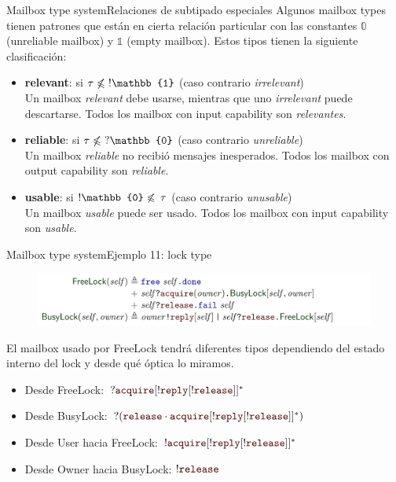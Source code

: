 \documentclass{beamer}
\newcommand{\msgtag}[1]{\texttt{\textcolor{msg-color}{#1}}}
\begin{document}
\begin{frame}{Mailbox type system}{Relaciones de subtipado especiales}
    Algunos mailbox types tienen patrones que están en cierta relación particular con las constantes $\mathbb{0}$ (unreliable mailbox) y $\mathbb{1}$ (empty mailbox). Estos tipos tienen la siguiente clasificación:
    \vspace{1em}

    \begin{itemize}
        \item \textbf{relevant}: si $\tau \not\leqslant \hspace{0.3em} !\mathbb{1}$ (caso contrario \emph{irrelevant})
        \\ Un mailbox \emph{relevant} debe usarse, mientras que uno \emph{irrelevant} puede descartarse. Todos los mailbox con input capability son \emph{relevantes}.
        \item \textbf{reliable}: si $\tau \not\leqslant \hspace{0.3em} ?\mathbb{0}$ (caso contrario \emph{unreliable})
        \\ Un mailbox \emph{reliable} no recibió mensajes inesperados. Todos los mailbox con output capability son \emph{reliable}.
        \item \textbf{usable}: si $!\mathbb{0} \not\leqslant \hspace{0.2em} \tau$ (caso contrario \emph{unusable})
        \\ Un mailbox \emph{usable} puede ser usado. Todos los mailbox con input capability son \emph{usable}.
    \end{itemize}
\end{frame}

\begin{frame}{Mailbox type system}{Ejemplo 11: lock type}
    \begin{figure}[H]
        \centering
        \includegraphics[width=\textwidth]{example1-lock}
    \end{figure}

    El mailbox usado por FreeLock tendrá diferentes tipos dependiendo del estado interno del lock y desde qué óptica lo miramos.
    \vspace{1em}

    \begin{itemize}
        \item Desde FreeLock: $?\msgtag{acquire}[!\msgtag{reply}[!\msgtag{release}]]^\ast$
        \item Desde BusyLock: $?(\msgtag{release} \cdot \msgtag{acquire}[!\msgtag{reply}[!\msgtag{release}]]^\ast)$
        \item Desde User hacia FreeLock: $!\msgtag{acquire}[!\msgtag{reply}[!\msgtag{release}]]^\ast$
        \item Desde Owner hacia BusyLock: $!\msgtag{release}$

    \end{itemize}
\end{frame}
\end{document}
